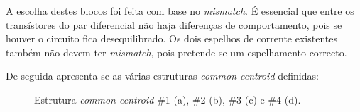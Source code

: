 \documentclass[11pt]{article}
\numberwithin{equation}{section}
\begin{document}
A escolha destes blocos foi feita com base no \textit{mismatch}. É essencial que entre os transístores do par diferencial não haja diferenças de comportamento, pois se houver o circuito fica desequilibrado. Os dois espelhos de corrente existentes também não devem ter \textit{mismatch}, pois pretende-se um espelhamento correcto. 

De seguida apresenta-se as várias estruturas \textit{common centroid} definidas:

\begin{figure}[H]
	\centering
	\hspace{8mm}
	\linebreak
	\hspace{40mm}
	\vspace{-0.8em}
	\caption{Estrutura \textit{common centroid} \#1 (a), \#2 (b), \#3 (c) e \#4 (d).}
	\vspace{-0.8em}
	\label{fig:common centroid}
\end{figure}
\end{document}
